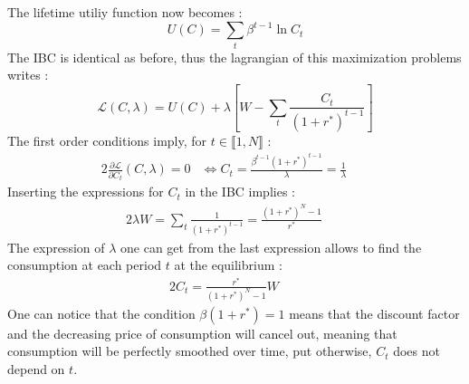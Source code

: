 \documentclass{article}
\begin{document}
\subsection{}
The lifetime utiliy function now becomes :
\begin{equation}
    U(C) = \sum_t \beta^{t-1} \ln C_t
\end{equation}
The IBC is identical as before, thus the lagrangian of this maximization problems writes :
\begin{equation}
    \mathcal{L}(C,\lambda) = U(C) + \lambda \left[ W - \sum_t \frac{C_t}{(1+r^*)^{t-1}} \right]
\end{equation}
The first order conditions imply, for $t \in \llbracket 1, N \rrbracket$ :
\begin{alignat*}{2}
    \frac{\partial\mathcal{L}}{\partial C_t} (C,\lambda) = 0 &\iff C_t = \frac{\beta^{t-1}(1+r^*)^{t-1}}{\lambda} = \frac{1}{\lambda}  \quad&
\end{alignat*}
Inserting the expressions for $C_t$ in the IBC implies :
\begin{alignat}{2}
    \lambda W = \sum_t \frac{1}{(1+r^*)^{t-1}} = \frac{(1+r^*)^N-1}{r^*}  \quad&
\end{alignat}
The expression of $\lambda$ one can get from the last expression allows to find the consumption at each period $t$ at the equilibrium :
\begin{alignat*}{2}
    C_t =   \frac{r^*}{(1+r^*)^N-1} W \quad&
\end{alignat*}
One can notice that the condition $\beta(1+r^*) = 1$ means that the discount factor and the decreasing price of consumption will cancel out, meaning that consumption will be perfectly smoothed over time, put otherwise, $C_t$ does not depend on $t$.
\end{document}
